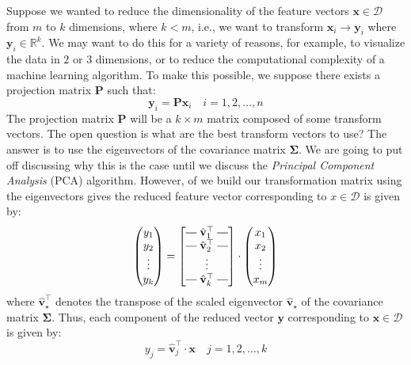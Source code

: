 \documentclass{article}[11pt]
\makeatletter
\newcommand{\brows}[1]{%
  \begin{bmatrix}
  \begin{array}{@{\protect\rotvert\;}c@{\;\protect\rotvert}}
  #1
  \end{array}
  \end{bmatrix}
}
\newcommand{\rotvert}{\rotatebox[origin=c]{90}{$\vert$}}
\newcommand{\rowsvdots}{\multicolumn{1}{@{}c@{}}{\vdots}}
\def\D{\mathcal{D}}
\makeatother
\begin{document}
Suppose we wanted to reduce the dimensionality of the feature vectors $\mathbf{x}\in\D$ from $m$ to $k$ dimensions, where $k<m$, 
i.e., we want to transform $\mathbf{x}_{i}\rightarrow\mathbf{y}_{i}$ where $\mathbf{y}_{i}\in\mathbb{R}^{k}$. 
We may want to do this for a variety of reasons, for example, to visualize the data in $2$ or $3$ dimensions, or to reduce the computational complexity of a machine learning algorithm.
To make this possible, we suppose there exists a projection matrix $\mathbf{P}$ such that:
\begin{equation}
   \mathbf{y}_{i} = \mathbf{P}\mathbf{x}_{i}\quad{i=1,2,\dots,n}
\end{equation}
The projection matrix $\mathbf{P}$ will be a $k\times{m}$ matrix composed of some transform vectors. The open question is 
what are the best transform vectors to use? The answer is to use the eigenvectors of the covariance matrix $\mathbf{\Sigma}$.
We are going to put off discussing why this is the case until we discuss the \emph{Principal Component Analysis} (PCA) algorithm.
However, of we build our transformation matrix using the eigenvectors gives the reduced feature vector corresponding to $x\in\D$ is given by:
\begin{equation}
   \begin{pmatrix}
      y_{1} \\
      y_{2} \\
      \vdots \\
      y_{k}
   \end{pmatrix} = \brows{\hat{\mathbf{v}}_1^\top \\ \hat{\mathbf{v}}_2^\top \\ \rowsvdots \\ \hat{\mathbf{v}}_k^\top}
   \cdot
   \begin{pmatrix}
      x_{1} \\
      x_{2} \\
      \vdots \\
      x_{m}
   \end{pmatrix}
\end{equation}
where $\hat{\mathbf{v}}_{\star}^{\top}$ denotes the transpose of the scaled eigenvector $\hat{\mathbf{v}}_{\star}$ of the covariance matrix $\mathbf{\Sigma}$.
Thus, each component of the reduced vector $\mathbf{y}$ corresponding to $\mathbf{x}\in\D$ is given by:
\begin{equation}
   y_{j} = \hat{\mathbf{v}}_{j}^{\top}\cdot\mathbf{x}\quad{j=1,2,\dots,k}
\end{equation}
\end{document}
